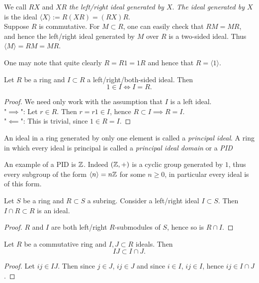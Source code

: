 \begin{remark}
    We call $RX$ and $XR$ \textit{the left/right ideal generated by $X$}. \textit{The ideal generated by $X$} is the ideal $\langle X\rangle := R(XR) = (RX)R$.\\ 
    Suppose $R$ is commutative. For $M\subset R$, one can easily check that $RM =MR$, and hence the left/right ideal generated by $M$ over $R$ is a two-sided ideal. Thus $\langle M\rangle = RM = MR$. 
\end{remark}
\begin{example}
    One may note that quite clearly $R = R1=1R$ and hence that $R= \langle 1\rangle$.
\end{example}
\begin{lemma}\label{IdealIsNonProperIff1IsInIdeal}
    Let $R$ be a ring and $I\subset R$ a left/right/both-sided ideal. Then 
    $$1\in I \iff I = R.$$
\end{lemma}
\begin{proof}
    We need only work with the assumption that $I$ is a left ideal.\\ 
    "$\implies$": Let $r \in R$. Then $r=r1\in I$, hence $R\subset I\implies R=I$.\\
    "$\impliedby$": This is trivial, since $1\in R = I$.
\end{proof}

\begin{definition}
    An ideal in a ring generated by only one element is called a \textit{principal ideal}. A ring in which every ideal is principal is called a \textit{principal ideal domain} or a \textit{PID}
\end{definition}
An example of a PID is $\mathbb{Z}$. Indeed $(\mathbb{Z},+)$ is a cyclic group generated by $1$, thus every subgroup of the form $\langle n\rangle = n\mathbb{Z}$ for some $n\geq 0$, in particular every ideal is of this form. 
\begin{proposition}\label{EliminationIdeal}
    Let $S$ be a ring and $R\subset S$ a subring. Consider a left/right ideal $I\subset S$. Then $I\cap R\subset R$ is an ideal.
\end{proposition}
\begin{proof}
    $R$ and $I$ are both left/right $R$-submodules of $S$, hence so is $R\cap I$.
\end{proof}
\begin{lemma}\label{IntersectionAndProductOfIdeals}
    Let $R$ be a commutative ring and $I,J\subset R$ ideals. Then 
    $$IJ\subset I\cap J.$$
\end{lemma}
\begin{proof}
    Let $ij\in IJ$. Then since $j\in J$, $ij\in J$ and since $i\in I$, $ij\in I$, hence $ij\in I\cap J$. 
\end{proof}
